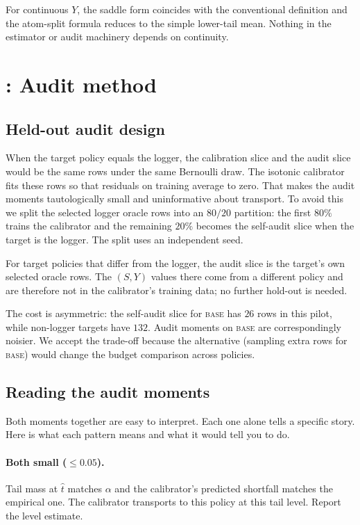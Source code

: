 \documentclass[11pt]{article}
\newcommand{\that}{\widehat{t}}
\begin{document}
For continuous $Y$, the saddle form coincides with the conventional
definition and the atom-split formula reduces to the simple lower-tail
mean. Nothing in the estimator or audit machinery depends on
continuity.

\section{: Audit method}
\label{app:audit-method}

\subsection{Held-out audit design}
\label{app:holdout}

When the target policy equals the logger, the calibration slice and
the audit slice would be the same rows under the same Bernoulli draw.
The isotonic calibrator fits these rows so that residuals on training
average to zero. That makes the audit moments tautologically small and
uninformative about transport. To avoid this we split the selected
logger oracle rows into an $80/20$ partition: the first $80\%$ trains
the calibrator and the remaining $20\%$ becomes the self-audit slice
when the target is the logger. The split uses an independent seed.

For target policies that differ from the logger, the audit slice is
the target's own selected oracle rows. The $(S, Y)$ values there come
from a different policy and are therefore not in the calibrator's
training data; no further hold-out is needed.

The cost is asymmetric: the self-audit slice for \textsc{base} has
$26$ rows in this pilot, while non-logger targets have $132$. Audit
moments on \textsc{base} are correspondingly noisier. We accept the
trade-off because the alternative (sampling extra rows for
\textsc{base}) would change the budget comparison across policies.

\subsection{Reading the audit moments}
\label{app:moments-interp}

Both moments together are easy to interpret. Each one alone tells a
specific story. Here is what each pattern means and what it would tell
you to do.

\paragraph{Both small ($\le 0.05$).} Tail mass at $\that$ matches
$\alpha$ and the calibrator's predicted shortfall matches the
empirical one. The calibrator transports to this policy at this tail
level. Report the level estimate.
\end{document}
